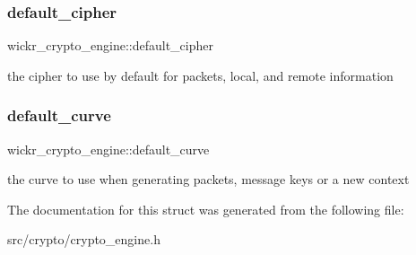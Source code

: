 \subsubsection{\texorpdfstring{default\+\_\+cipher}{default\_cipher}}
{\footnotesize\ttfamily wickr\+\_\+crypto\+\_\+engine\+::default\+\_\+cipher}

the cipher to use by default for packets, local, and remote information \mbox{\label{structwickr__crypto__engine_a2145e35235dc5c5c944f33ea3d2963bd}} 
\subsubsection{\texorpdfstring{default\+\_\+curve}{default\_curve}}
{\footnotesize\ttfamily wickr\+\_\+crypto\+\_\+engine\+::default\+\_\+curve}

the curve to use when generating packets, message keys or a new context 

The documentation for this struct was generated from the following file\+:\begin{DoxyCompactItemize}
\item 
src/crypto/crypto\+\_\+engine.\+h\end{DoxyCompactItemize}

